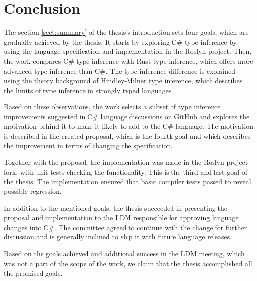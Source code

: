 \chapter*{Conclusion}

The section \ref{sect:summary} of the thesis's introduction sets four goals, which are gradually achieved by the thesis. 
It starts by exploring C\# type inference by using the language specification and implementation in the Roslyn project. 
Then, the work compares C\# type inference with Rust type inference, which offers more advanced type inference than C\#. 
The type inference difference is explained using the theory background of Hindley-Milner type inference, which describes the limits of type inference in strongly typed languages.
\par
Based on these observations, the work selects a subset of type inference improvements suggested in C\# language discussions on GitHub and explores the motivation behind it to make it likely to add to the C\# language. 
The motivation is described in the created proposal, which is the fourth goal and which describes the improvement in terms of changing the specification.
\par
Together with the proposal, the implementation was made in the Roslyn project fork, with unit tests checking the functionality. 
This is the third and last goal of the thesis. 
The implementation ensured that basic compiler tests passed to reveal possible regression.
\par
In addition to the mentioned goals, the thesis succeeded in presenting the proposal and implementation to the \ac{LDM} responsible for approving language changes into C\#. 
The committee agreed to continue with the change for further discussion and is generally inclined to ship it with future language releases.
\par
Based on the goals achieved and additional success in the \ac{LDM} meeting, which was not a part of the scope of the work, we claim that the thesis accomplished all the promised goals.
